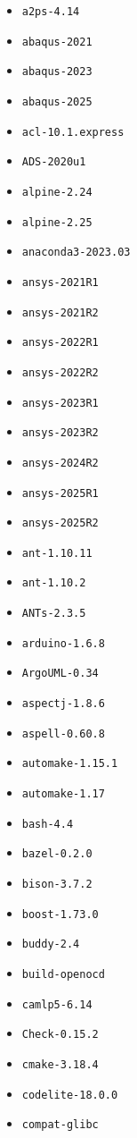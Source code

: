 \scriptsize
\begin{multicols}{3}
\begin{itemize}
\item \verb|a2ps-4.14|
\item \verb|abaqus-2021|
\item \verb|abaqus-2023|
\item \verb|abaqus-2025|
\item \verb|acl-10.1.express|
\item \verb|ADS-2020u1|
\item \verb|alpine-2.24|
\item \verb|alpine-2.25|
\item \verb|anaconda3-2023.03|
\item \verb|ansys-2021R1|
\item \verb|ansys-2021R2|
\item \verb|ansys-2022R1|
\item \verb|ansys-2022R2|
\item \verb|ansys-2023R1|
\item \verb|ansys-2023R2|
\item \verb|ansys-2024R2|
\item \verb|ansys-2025R1|
\item \verb|ansys-2025R2|
\item \verb|ant-1.10.11|
\item \verb|ant-1.10.2|
\item \verb|ANTs-2.3.5|
\item \verb|arduino-1.6.8|
\item \verb|ArgoUML-0.34|
\item \verb|aspectj-1.8.6|
\item \verb|aspell-0.60.8|
\item \verb|automake-1.15.1|
\item \verb|automake-1.17|
\item \verb|bash-4.4|
\item \verb|bazel-0.2.0|
\item \verb|bison-3.7.2|
\item \verb|boost-1.73.0|
\item \verb|buddy-2.4|
\item \verb|build-openocd|
\item \verb|camlp5-6.14|
\item \verb|Check-0.15.2|
\item \verb|cmake-3.18.4|
\item \verb|codelite-18.0.0|
\item \verb|compat-glibc|

\end{itemize}
\end{multicols}
